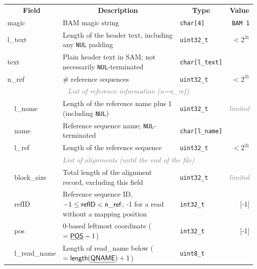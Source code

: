 \documentclass[10pt]{article}
\newcommand*{\memlimited}{\textcolor{gray}{\footnotesize\it limited}}
\begin{document}
\begin{table}[ht]
\centering
{\small
\begin{tabular}{|l|l|l|p{8.15cm}|l|r|}
  \cline{1-6}
  \multicolumn{3}{|c|}{\bf Field} & \multicolumn{1}{c|}{\bf Description} & \multicolumn{1}{c|}{\bf Type} & \multicolumn{1}{c|}{\bf Value} \\\cline{1-6}
  \multicolumn{3}{|l|}{\sf magic} & BAM magic string & {\tt char[4]} & {\tt BAM\char92 1}\\\cline{1-6}
  \multicolumn{3}{|l|}{\sf l\_text} & Length of the header text, including any {\tt NUL} padding & {\tt uint32\_t} & $< 2^{31}$ \\\cline{1-6}
  \multicolumn{3}{|l|}{\sf text} & Plain header text in SAM; not necessarily {\tt NUL}-terminated & {\tt char[{\sf l\_text}]} & \\\cline{1-6}
  \multicolumn{3}{|l|}{\sf n\_ref} & \# reference sequences & {\tt uint32\_t} & $< 2^{31}$ \\\cline{1-6}
  \multicolumn{6}{|c|}{\textcolor{gray}{\it List of reference information (n=n\_ref)}} \\\cline{2-6}
  & \multicolumn{2}{l|}{\sf l\_name} & Length of the reference name plus 1 (including {\tt NUL}) & {\tt uint32\_t} & \memlimited \\\cline{2-6}
  & \multicolumn{2}{l|}{\sf name} & Reference sequence name; {\tt NUL}-terminated & {\tt char[{\sf l\_name}]} & \\\cline{2-6}
  & \multicolumn{2}{l|}{\sf l\_ref} & Length of the reference sequence & {\tt uint32\_t} & $< 2^{31}$ \\\cline{1-6}
  \multicolumn{6}{|c|}{\textcolor{gray}{\it List of alignments (until the end of the file)}} \\\cline{2-6}
  & \multicolumn{2}{l|}{\sf block\_size} & Total length of the alignment record, excluding this field & {\tt uint32\_t} & \memlimited \\\cline{2-6}
  & \multicolumn{2}{l|}{\sf refID} & Reference sequence ID, $-1\leq{\sf refID}<{\sf n\_ref}$; -1 for a read without a mapping position & {\tt int32\_t} & [-1] \\\cline{2-6}
  & \multicolumn{2}{l|}{\sf pos} & 0-based leftmost coordinate ($=\underline{\sf POS}-1$)& {\tt int32\_t} & [-1]\\\cline{2-6}
  & \multicolumn{2}{l|}{\sf l\_read\_name} & Length of {\sf read\_name} below ($={\sf length}(\underline{\sf QNAME})+1$) & {\tt uint8\_t} & \\\cline{2-6}

\end{tabular}}
\end{table}
\end{document}
